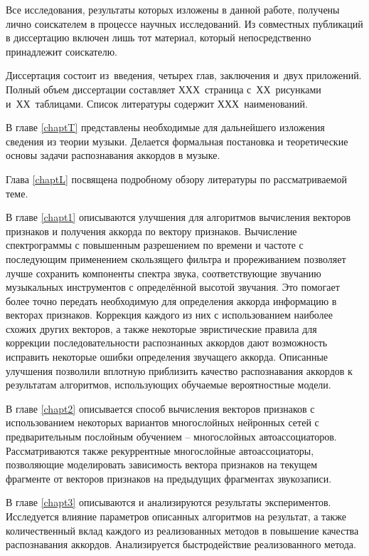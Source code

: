 Все исследования, результаты которых изложены в данной работе, получены лично
соискателем в процессе научных исследований. Из совместных публикаций в
диссертацию включен лишь тот материал, который непосредственно принадлежит
соискателю.

\medskip

Диссертация состоит из~введения, четырех глав, заключения и~двух приложений.
Полный объем диссертации составляет ХХХ~страница с~ХХ~рисунками и~ХХ~таблицами.
Список литературы содержит ХХХ~наименований.

В главе \ref{chaptT} представлены необходимые для дальнейшего изложения сведения
из теории музыки. Делается формальная постановка и теоретические основы задачи
распознавания аккордов в музыке.

Глава \ref{chaptL} посвящена подробному обзору литературы по рассматриваемой
теме. 

В главе \ref{chapt1} описываются улучшения для алгоритмов вычисления векторов
признаков и получения аккорда по вектору признаков. Вычисление спектрограммы с
повышенным разрешением по времени и частоте с последующим применением
скользящего фильтра и прореживанием позволяет лучше сохранить компоненты спектра
звука, соответствующие звучанию музыкальных инструментов с определённой высотой
звучания. Это помогает более точно передать необходимую для определения аккорда
информацию в векторах признаков. Коррекция каждого из них с использованием
наиболее схожих других векторов, а также некоторые эвристические правила для
коррекции последовательности распознанных аккордов дают возможность исправить
некоторые ошибки определения звучащего аккорда. Описанные улучшения позволили
вплотную приблизить качество распознавания аккордов к результатам алгоритмов,
использующих обучаемые вероятностные модели.

В главе \ref{chapt2} описывается способ вычисления векторов признаков с
использованием некоторых вариантов многослойных нейронных сетей с
предварительным послойным обучением -- многослойных автоассоциаторов.
Рассматриваются также рекуррентные многослойные автоассоциаторы, позволяющие
моделировать зависимость вектора признаков на текущем фрагменте от векторов
признаков на предыдущих фрагментах звукозаписи.

В главе \ref{chapt3} описываются и анализируются результаты экспериментов.
Исследуется влияние параметров описанных алгоритмов на результат, а также
количественный вклад каждого из реализованных методов в повышение качества
распознавания аккордов. Анализируется быстродействие реализованного метода.

